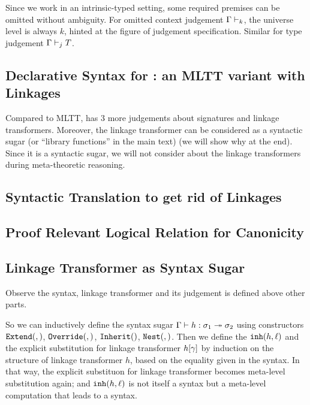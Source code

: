 Since we work in an intrinsic-typed setting, some required premises can be omitted without ambiguity. For omitted context judgement $\goodCtx{\Gm}{k}$, the universe level is always $k$, hinted at the figure of judgement specification. Similar for type judgement $\goodType{\Gm}{T}{j}$.



\subsection{Declarative Syntax for \TT : an MLTT variant with Linkages}
Compared to MLTT, \TT has 3 more judgements about signatures and linkage transformers. Moreover, the linkage transformer can be considered as a syntactic sugar (or ``library functions'' in the main text) (we will show why at the end). 
Since it is a syntactic sugar, we will not consider about the linkage transformers during meta-theoretic reasoning.









\subsection{Syntactic Translation to get rid of Linkages}




% 


\subsection{Proof Relevant Logical Relation for Canonicity}


\subsection{Linkage Transformer as Syntax Sugar}
Observe the syntax, linkage transformer and its judgement is defined above 
other parts. 

So we can inductively define the syntax sugar $\goodInh{\Gm}{h}{\lsig_1}{\lsig_2}$ using constructors $\InhExt{}{}$, $\InhOv{}{}$, $\InhInh{}$, $\InhNest{}{}$. Then we define the $\inh{h}{\ell}$ and the explicit substitution for linkage transformer $\sub{h}{\gm}$ by induction on the structure of linkage transformer $h$, based on the equality
given in the syntax. In that way, the explicit substituon for linkage transformer becomes meta-level substitution again; and $\inh{h}{\ell}$ is not itself a syntax but a meta-level computation that leads to a syntax.